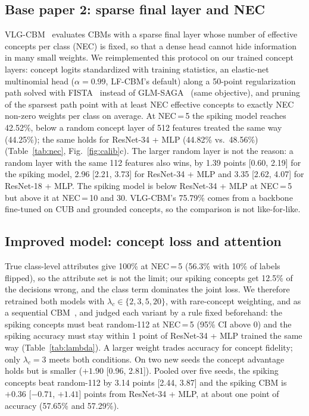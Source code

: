 \documentclass[conference]{IEEEtran}
\begin{document}
\subsection{Base paper 2: sparse final layer and NEC}
VLG-CBM~\cite{srivastava2024vlgcbm} evaluates CBMs with a sparse final layer whose number of effective concepts per class (NEC) is fixed, so that a dense head cannot hide information in many small weights. We reimplemented this protocol on our trained concept layers: concept logits standardized with training statistics, an elastic-net~\cite{zou2005regularization} multinomial head ($\alpha=0.99$, LF-CBM's default) along a 50-point regularization path solved with FISTA~\cite{beck2009fast} instead of GLM-SAGA~\cite{wong2021leveraging} (same objective), and pruning of the sparsest path point with at least NEC effective concepts to exactly NEC non-zero weights per class on average. At NEC\,=\,5 the spiking model reaches 42.52\%, below a random concept layer of 512 features treated the same way (44.25\%); the same holds for ResNet-34 + MLP (44.82\% vs.\ 48.56\%) (Table~\ref{tab:nec}, Fig.~\ref{fig:calib}c). The larger random layer is not the reason: a random layer with the same 112 features also wins, by 1.39 points [0.60, 2.19] for the spiking model, 2.96 [2.21, 3.73] for ResNet-34 + MLP and 3.35 [2.62, 4.07] for ResNet-18 + MLP. The spiking model is below ResNet-34 + MLP at NEC\,=\,5 but above it at NEC\,=\,10 and 30. VLG-CBM's 75.79\% comes from a backbone fine-tuned on CUB and grounded concepts, so the comparison is not like-for-like.

\subsection{Improved model: concept loss and attention}\label{sec:improved}\label{sec:lambda}

True class-level attributes give 100\% at NEC\,=\,5 (56.3\% with 10\% of labels flipped), so the attribute set is not the limit; our spiking concepts get 12.5\% of the decisions wrong, and the class term dominates the joint loss. We therefore retrained both models with $\lambda_c\in\{2,3,5,20\}$, with rare-concept weighting, and as a sequential CBM~\cite{koh2020concept}, and judged each variant by a rule fixed beforehand: the spiking concepts must beat random-112 at NEC\,=\,5 (95\% CI above 0) and the spiking accuracy must stay within 1 point of ResNet-34 + MLP trained the same way (Table~\ref{tab:lambda}). A larger weight trades accuracy for concept fidelity; only $\lambda_c=3$ meets both conditions. On two new seeds the concept advantage holds but is smaller ($+1.90$ [0.96, 2.81]). Pooled over five seeds, the spiking concepts beat random-112 by 3.14 points [2.44, 3.87] and the spiking CBM is $+0.36$ [$-0.71$, $+1.41$] points from ResNet-34 + MLP, at about one point of accuracy (57.65\% and 57.29\%). 
\end{document}
